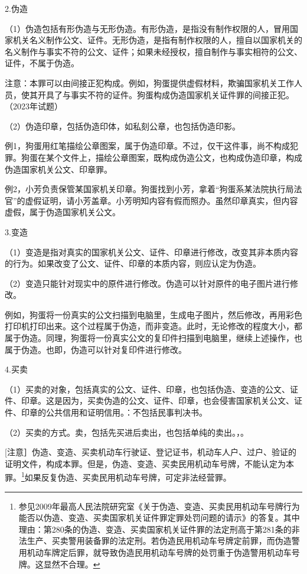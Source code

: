 2.伪造

（1）伪造包括有形伪造与无形伪造。有形伪造，是指没有制作权限的人，冒用国家机关名义制作公文、证件。无形伪造，是指有制作权限的人，擅自以国家机关的名义制作与事实不符的公文、证件；如果未经授权，擅自制作与事实相符的公文、证件，不属于伪造。

注意：本罪可以由间接正犯构成。例如，狗蛋提供虚假材料，欺骗国家机关工作人员，使其开具了与事实不符的证件。狗蛋构成伪造国家机关证件罪的间接正犯。（2023年试题）

（2）伪造印章，包括伪造印体，如私刻公章，也包括伪造印影。

例1，狗蛋用红笔描绘公章图案，属于伪造印章。不过，仅干这件事，尚不构成犯罪。狗蛋在某个文件上，描绘公章图案，既构成伪造公文，也构成伪造印章，构成伪造国家机关公文、印章罪。

例2，小芳负责保管某国家机关印章。狗蛋找到小芳，拿着“狗蛋系某法院执行局法官”的虚假证明，请小芳盖章。小芳明知内容有假而照办。虽然印章真实，但内容虚假，属于伪造国家机关公文。

3.变造

（1）变造是指对真实的国家机关公文、证件、印章进行修改，改变其非本质内容的行为。如果改变了公文、证件、印章的本质内容，则应认定为伪造。

（2）变造只能针对现实中的原件进行修改。伪造可以针对原件的电子图片进行修改。

例如，狗蛋将一份真实的公文扫描到电脑里，生成电子图片，然后修改，再用彩色打印机打印出来。这个过程属于伪造，而非变造。此时，无论修改的程度大小，都属于伪造。同理，狗蛋将一份真实公文的复印件扫描到电脑里，继续上述操作，也属于伪造。也即，伪造可以针对复印件进行修改。

4.买卖

（1）买卖的对象，包括真实的公文、证件、印章，也包括伪造、变造的公文、证件、印章。这是因为，买卖伪造的公文、证件、印章，也会侵害国家机关公文、证件、印章的公共信用和证明信用。：不包括民事判决书。

（2）买卖的方式。卖，包括先买进后卖出，也包括单纯的卖出。，。

[注意］伪造、变造、买卖机动车行驶证、登记证书，机动车人户、过户、验证的证明文件，构成本罪。但是，伪造、变造、买卖民用机动车号牌，不能认定为本罪。\footnote{参见2009年最高人民法院研究室《关于伪造、变造、买卖民用机动车号牌行为能否以伪造、变造、买卖国家机关证件罪定罪处罚问题的请示》的答复。其中理由：第280条的伪造、变造、买卖国家机关证件罪的法定刑高于第281条的非法生产、买卖警用装备罪的法定刑。若伪造民用机动车号牌定前罪，而伪造警用机动车牌定后罪，就导致伪造民用机动车号牌的处罚重于伪造警用机动车号牌。这显然不合理。}如果反复伪造、买卖民用机动车号牌，可定非法经营罪。

